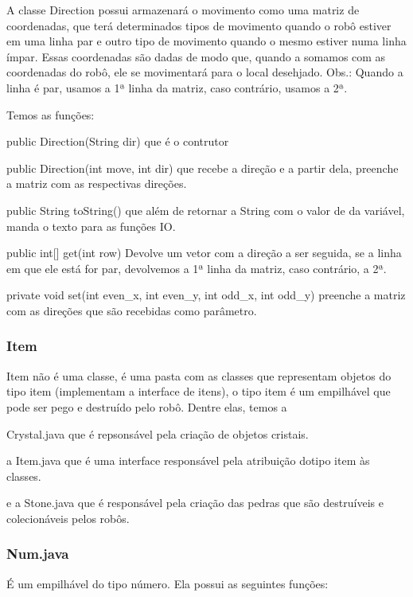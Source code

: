 \documentclass[a4paper]{article}
\begin{document}
			A classe Direction possui armazenará o movimento
			como uma matriz de coordenadas, que terá
			determinados tipos de movimento quando o robô 
			estiver em uma linha par e outro tipo de movimento
			quando o mesmo estiver numa linha ímpar.
			Essas coordenadas são dadas de modo que, quando
			a somamos com as coordenadas do robô, ele se 
			movimentará para o local desehjado.
			Obs.: Quando a linha é par, usamos a 1ª linha da
			matriz, caso contrário, usamos a 2ª.
			
			Temos as funções:
			
			public Direction(String dir)
			que é o contrutor
			
			public Direction(int move, int dir)
			que recebe a direção e a partir dela, preenche a
			matriz com as respectivas direções.
			
			public String toString()
			que além de retornar a String com o valor de
			da variável, manda o texto para as funções IO.
			
			public int[] get(int row)
			Devolve um vetor com a direção a ser seguida, se
			a linha em que ele está for par, devolvemos a
			1ª linha da matriz, caso contrário, a 2ª.
			
			private void set(int even\_x, int even\_y, int odd\_x, int odd\_y)
			preenche a matriz com as direções que são recebidas
			como parâmetro.
		
		\subsubsection { Item }
			Item não é uma classe, é uma pasta com as 
			classes que representam objetos do tipo item
			(implementam a interface de itens),
			o tipo item é um empilhável que pode ser pego
			e destruído pelo robô.
			Dentre elas, temos a
			 
			Crystal.java que é repsonsável pela criação de
			objetos cristais.
			
			a Item.java que é uma interface responsável pela 
			atribuição dotipo item às classes.
			
			e a Stone.java que é responsável pela criação
			das pedras que são destruíveis e colecionáveis
			pelos robôs.
			 
		\subsubsection { Num.java }
			É um empilhável do tipo número.
			Ela possui as seguintes funções:
			
\end{document}
